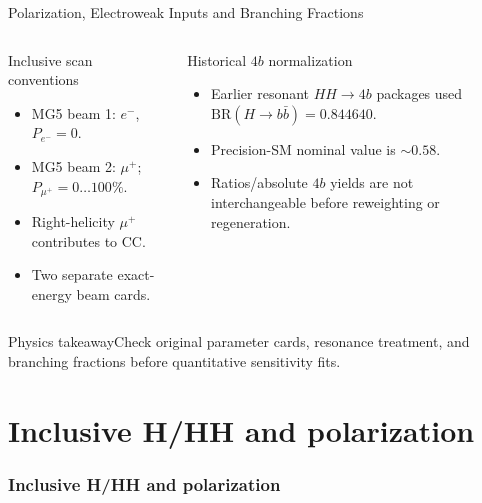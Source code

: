 \documentclass[aspectratio=1610,english]{beamer}
\newcommand{\src}[1]{\vfill{\par\color{black!65}\fontsize{6.4}{7.4}\selectfont\emph{Source:} #1\par}}
\newcommand{\key}[1]{\begin{alertblock}{Physics takeaway}\scriptsize #1\end{alertblock}}
\begin{document}
\begin{frame}[t]{Polarization, Electroweak Inputs and Branching Fractions}
\small

\begin{columns}%
\begin{block}{Inclusive scan conventions}
\begin{itemize}\item MG5 beam 1: $e^-$, $P_{e^-}=0$.
\item MG5 beam 2: $\mu^+$; $P_{\mu^+}=0\ldots100\%$.
\item Right-helicity $\mu^+$ contributes to CC.
\item Two separate exact-energy beam cards.
\end{itemize}\end{block}
\begin{alertblock}{Historical $4b$ normalization}
\begin{itemize}\item Earlier resonant $HH\to4b$ packages used
$\mathrm{BR}(H\to b\bar b)=0.844640$.
\item Precision-SM nominal value is $\sim0.58$.
\item Ratios/absolute $4b$ yields are not interchangeable before reweighting or regeneration.
\end{itemize}\end{alertblock}
\end{columns}
\key{Check original parameter cards, resonance treatment, and branching fractions before quantitative sensitivity fits.}

\end{frame}



\part{Inclusive H/HH and polarization}
\section{Inclusive H/HH and polarization}
\end{document}
